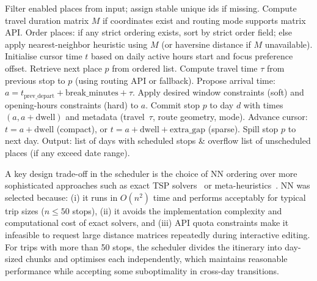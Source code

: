 \begin{algorithm}[H]
\caption{Auto-scheduling algorithm: NN ordering with constraint handling (simplified)}
\label{alg:autoplan}
\begin{algorithmic}[1]
\STATE Filter enabled places from input; assign stable unique ids if missing.
\STATE Compute travel duration matrix $M$ if coordinates exist and routing mode supports matrix API.
\STATE Order places: if any strict ordering exists, sort by strict order field; else apply nearest-neighbor heuristic using $M$ (or haversine distance if $M$ unavailable).
  \STATE Initialise cursor time $t$ based on daily active hours start and focus preference offset.
    \STATE Retrieve next place $p$ from ordered list.
    \STATE Compute travel time $\tau$ from previous stop to $p$ (using routing API or fallback).
    \STATE Propose arrival time: $a = t_{\text{prev\_depart}} + \text{break\_minutes} + \tau$.
    \STATE Apply desired window constraints (soft) and opening-hours constraints (hard) to $a$.
      \STATE Commit stop $p$ to day $d$ with times $(a, a + \text{dwell})$ and metadata (travel~$\tau$, route geometry, mode).
      \STATE Advance cursor: $t = a + \text{dwell}$ (compact), or $t = a + \text{dwell} + \text{extra\_gap}$ (sparse).
    \ELSE
      \STATE Spill stop $p$ to next day.
    \ENDIF
  \ENDWHILE
\ENDFOR
\STATE Output: list of days with scheduled stops \& overflow list of unscheduled places (if any exceed date range).
\end{algorithmic}
\end{algorithm}

A key design trade-off in the scheduler is the choice of NN ordering over more sophisticated approaches such as exact TSP solvers~\cite{applegate-tsp} or meta-heuristics~\cite{johnson-mcgeoch}. NN was selected because: (i) it runs in $O(n^2)$ time and performs acceptably for typical trip sizes ($n \le 50$ stops), (ii) it avoids the implementation complexity and computational cost of exact solvers, and (iii) API quota constraints make it infeasible to request large distance matrices repeatedly during interactive editing. For trips with more than 50 stops, the scheduler divides the itinerary into day-sized chunks and optimises each independently, which maintains reasonable performance while accepting some suboptimality in cross-day transitions.

